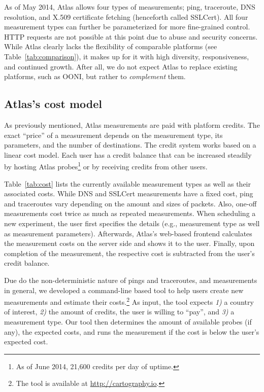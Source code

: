 As of May 2014, Atlas allows four types of measurements; ping, traceroute, DNS
resolution, and X.509 certificate fetching (henceforth called SSLCert).  All
four measurement types can further be parameterized for more fine-grained
control.  HTTP requests are not possible at this point due to abuse and
security concerns.  While Atlas clearly lacks the flexibility of comparable
platforms (see Table~\ref{tab:comparison}), it makes up for it with high
diversity, responsiveness, and continued growth.  After all, we do not expect
Atlas to replace existing platforms, such as OONI, but rather to
\emph{complement} them.


\subsection{Atlas's cost model}

As previously mentioned, Atlas measurements are paid with platform credits.
The exact ``price'' of a measurement depends on the measurement type, its
parameters, and the number of destinations.  The credit system works based on a
linear cost model.  Each user has a credit balance that can be increased
steadily by hosting Atlas probes\footnote{As of June 2014, 21,600 credits per
day of uptime.} or by receiving credits from other users.

Table~\ref{tab:cost} lists the currently available measurement types as well as
their associated costs.  While DNS and SSLCert measurements have a fixed cost,
ping and traceroutes vary depending on the amount and sizes of packets.  Also,
one-off measurements cost twice as much as repeated measurements.  When
scheduling a new experiment, the user first specifies the details (e.g.,
measurement type as well as measurement parameters).  Afterwards, Atlas's
web-based frontend calculates the measurement costs on the server side and
shows it to the user.  Finally, upon completion of the measurement, the
respective cost is subtracted from the user's credit balance.

Due do the non-deterministic nature of pings and traceroutes, and measurements
in general, we developed a command-line based tool to help users create new
measurements and estimate their costs.\footnote{The tool is available at
\url{http://cartography.io}.}  As input, the tool expects \emph{1)}
a country of interest, \emph{2)} the amount of credits, the user is willing
to ``pay'', and \emph{3)} a measurement type.  Our tool then determines the
amount of available probes (if any), the expected costs, and runs the
measurement if the cost is below the user's expected cost.

